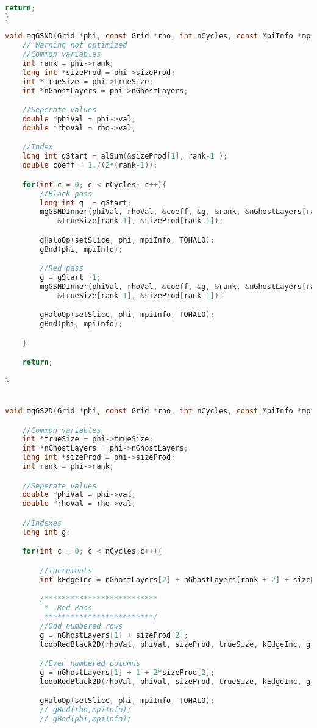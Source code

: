 \begin{lstlisting}[language=c, caption = main routine]
	return;
}

void mgGSND(Grid *phi, const Grid *rho, int nCycles, const MpiInfo *mpiInfo){
	// Warning not optimized
	//Common variables
	int rank = phi->rank;
	long int *sizeProd = phi->sizeProd;
	int *trueSize = phi->trueSize;
	int *nGhostLayers = phi->nGhostLayers;

	//Seperate values
	double *phiVal = phi->val;
	double *rhoVal = rho->val;

	//Index
	long int gStart = alSum(&sizeProd[1], rank-1 );
	double coeff = 1./(2*(rank-1));

	for(int c = 0; c < nCycles; c++){
		//Black pass
		long int g  = gStart;
		mgGSNDInner(phiVal, rhoVal, &coeff, &g, &rank, &nGhostLayers[rank-1], &nGhostLayers[2*rank-1],
			&trueSize[rank-1], &sizeProd[rank-1]);

		gHaloOp(setSlice, phi, mpiInfo, TOHALO);
		gBnd(phi, mpiInfo);

		//Red pass
		g = gStart +1;
		mgGSNDInner(phiVal, rhoVal, &coeff, &g, &rank, &nGhostLayers[rank-1], &nGhostLayers[2*rank-1],
			&trueSize[rank-1], &sizeProd[rank-1]);

		gHaloOp(setSlice, phi, mpiInfo, TOHALO);
		gBnd(phi, mpiInfo);

	}

	return;

}


void mgGS2D(Grid *phi, const Grid *rho, int nCycles, const MpiInfo *mpiInfo){

	//Common variables
	int *trueSize = phi->trueSize;
	int *nGhostLayers = phi->nGhostLayers;
	long int *sizeProd = phi->sizeProd;
	int rank = phi->rank;

	//Seperate values
	double *phiVal = phi->val;
	double *rhoVal = rho->val;

	//Indexes
	long int g;

	for(int c = 0; c < nCycles;c++){

		//Increments
		int kEdgeInc = nGhostLayers[2] + nGhostLayers[rank + 2] + sizeProd[2];

		/**************************
		 *	Red Pass
		 *************************/
		//Odd numbered rows
		g = nGhostLayers[1] + sizeProd[2];
		loopRedBlack2D(rhoVal, phiVal, sizeProd, trueSize, kEdgeInc, g);

		//Even numbered columns
		g = nGhostLayers[1] + 1 + 2*sizeProd[2];
		loopRedBlack2D(rhoVal, phiVal, sizeProd, trueSize, kEdgeInc, g);

		gHaloOp(setSlice, phi, mpiInfo, TOHALO);
		// gBnd(rho,mpiInfo);
		// gBnd(phi,mpiInfo);



\end{lstlisting}
